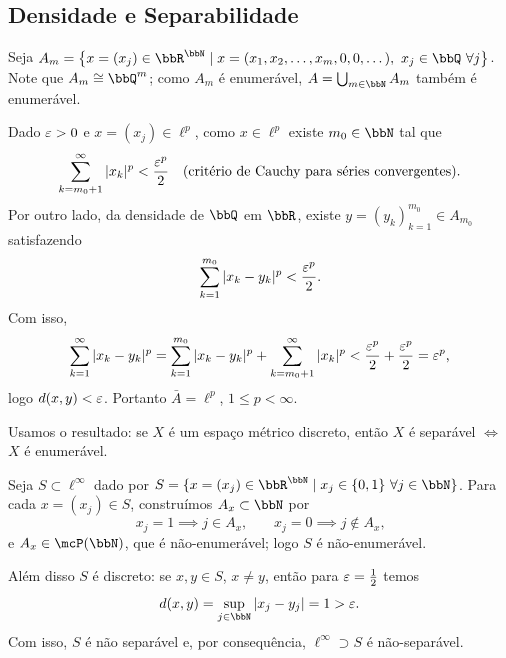 


\subsection{Densidade e Separabilidade}


\begin{myproof}
	Seja $A_m=\big\{x=(x_j)\in\bbR^{\bbN} \mid x=(x_1,x_2,\dots,x_m,0,0,\dots),\ x_j\in\bbQ\ \forall j\big\}$.
	Note que $A_m\cong \bbQ^m$; como $A_m$ é enumerável, $A=\bigcup_{m\in\bbN}A_m$ também é enumerável.

	Dado $\varepsilon>0$ e $x=(x_j)\in\ell^p$, como $x\in\ell^p$ existe $m_0\in\bbN$ tal que
	$$\sum_{k=m_0+1}^{\infty}|x_k|^p<\frac{\varepsilon^p}{2} \quad \text{(critério de Cauchy para séries convergentes).}$$
	Por outro lado, da densidade de $\bbQ$ em $\bbR$, existe $y=(y_k)_{k=1}^{m_0}\in A_{m_0}$ satisfazendo
	$$\sum_{k=1}^{m_0}|x_k-y_k|^p<\frac{\varepsilon^p}{2}\text{.}$$
	Com isso,
	$$\sum_{k=1}^{\infty}|x_k-y_k|^p=\sum_{k=1}^{m_0}|x_k-y_k|^p+\sum_{k=m_0+1}^{\infty}|x_k|^p<\frac{\varepsilon^p}{2}+\frac{\varepsilon^p}{2}=\varepsilon^p\text{,}$$
	logo $d(x,y)<\varepsilon$. Portanto $\bar A=\ell^p$, $1\leq p<\infty$.
\end{myproof}

\begin{myproof}
	Usamos o resultado: se $X$ é um espaço métrico discreto, então $X$ é separável $\iff$ $X$ é enumerável.

	Seja $S\subset \ell^\infty$ dado por $S=\{x=(x_j)\in\bbR^{\bbN} \mid x_j\in\{0,1\}\ \forall j\in\bbN\}$.
	Para cada $x=(x_j)\in S$, construímos $A_x\subset\bbN$ por
	$$x_j=1 \implies j\in A_x\text{,}\qquad x_j=0 \implies j\notin A_x\text{,}$$
	e $A_x\in\mcP(\bbN)$, que é não-enumerável; logo $S$ é não-enumerável.

	Além disso $S$ é discreto: se $x,y\in S$, $x\neq y$, então para $\varepsilon=\frac12$ temos
	$$d(x,y)=\sup_{j\in\bbN}|x_j-y_j|=1>\eps\text{.}$$
	Com isso, $S$ é não separável e, por consequência, $\ell^\infty\supset S$ é não-separável.
\end{myproof}


